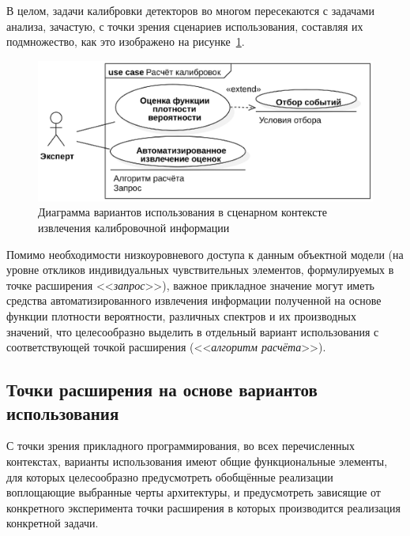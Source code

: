 В целом, задачи калибровки детекторов во многом пересекаются с задачами
анализа, зачастую, с точки зрения сценариев использования, составляя
их подмножество, как это изображено на рисунке~\ref{fig:usecases-get-calibrations}.

\begin{figure}[ht!]
    \centering
    \includegraphics[width=0.75\linewidth]{images/usecases/calibration-usecase.eps}
    \caption{Диаграмма вариантов использования в сценарном контексте извлечения калибровочной информации}
    \label{fig:usecases-get-calibrations}
\end{figure}

Помимо необходимости низкоуровневого доступа к данным объектной
модели (на уровне откликов индивидуальных чувствительных элементов,
формулируемых в точке расширения <<\emph{запрос}>>),
важное прикладное значение могут иметь средства автоматизированного
извлечения информации полученной на основе функции плотности
вероятности, различных спектров и их производных значений, что
целесообразно выделить в отдельный вариант использования с соответствующей
точкой расширения (<<\emph{алгоритм расчёта}>>).

\subsection{Точки расширения на основе вариантов использования}

С точки зрения прикладного программирования, во всех перечисленных
контекстах, варианты использования имеют общие функциональные
элементы, для которых целесообразно предусмотреть обобщённые
реализации воплощающие выбранные черты архитектуры, и
предусмотреть  зависящие от конкретного эксперимента точки
расширения в которых производится реализация конкретной задачи.

